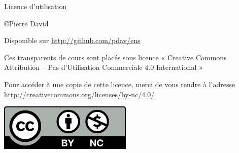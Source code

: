 \begin {frame} {Licence d'utilisation}

    \fB

    \copyright Pierre David

    \vspace* {3mm}

    Disponible sur \url {http://github.com/pdav/ens}

    \vspace* {3mm}

    Ces transparents de cours sont placés sous licence « Creative
    Commons Attribution -- Pas d’Utilisation Commerciale 4.0
    International »

    \vspace* {3mm}

    Pour accéder à une copie de cette licence,
    merci de vous rendre à l'adresse
    \url {http://creativecommons.org/licenses/by-nc/4.0/}

    \vspace* {3mm}

    \includegraphics [scale=.7] {by-nc}
\end {frame}
